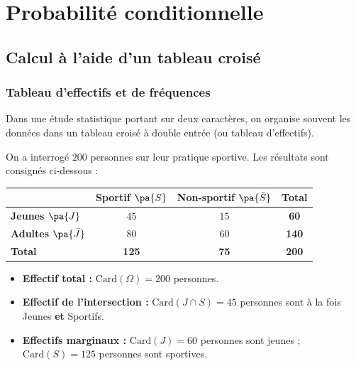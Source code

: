 \chapter{Probabilité conditionnelle}

\section{Calcul à l'aide d'un tableau croisé}

\subsection{Tableau d'effectifs et de fréquences}

Dans une étude statistique portant sur deux caractères, on organise souvent les données dans un tableau croisé à double entrée (ou tableau d'effectifs).

\begin{ex}
	On a interrogé $200$ personnes sur leur pratique sportive. Les résultats sont consignés ci-dessous :

	\begin{center}
		\def\arraystretch{1.5}
		\begin{tabular}{|l|c|c|c|} \hline
			                                & \textbf{Sportif $\pa{S}$} & \textbf{Non-sportif $\pa{\bar{S}}$} & \textbf{Total} \\ \hline
			\textbf{Jeunes $\pa{J}$}        & $45$                      & $15$                                & \textbf{60}    \\ \hline
			\textbf{Adultes $\pa{\bar{J}}$} & $80$                      & $60$                                & \textbf{140}   \\ \hline
			\textbf{Total}                  & \textbf{125}              & \textbf{75}                         & \textbf{200}   \\ \hline
		\end{tabular}
	\end{center}

	\begin{itemize}
		\item \textbf{Effectif total :} $\text{Card}(\Omega) = 200$ personnes.
		\item \textbf{Effectif de l'intersection :} $\text{Card}(J \cap S) = 45$ personnes sont à la fois \og{}Jeunes\fg{} \textbf{et} \og{}Sportifs\fg{}.
		\item \textbf{Effectifs marginaux :} $\text{Card}(J) = 60$ personnes sont jeunes ; $\text{Card}(S) = 125$ personnes sont sportives.
	\end{itemize}
\end{ex}

